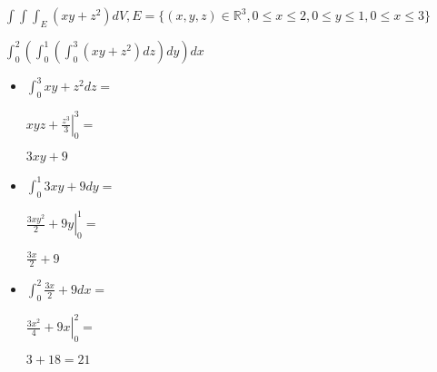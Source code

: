 \documentclass[../practica_08.tex]{subfiles}
\begin{document}
    $ \int \int \int_E (xy + z^2) dV, E = \{(x,y,z) \in \mathbb{R}^3, 0\leq x\leq 2, 0\leq y\leq 1, 0\leq x \leq 3\}$

    $ \int_0^2 (\int_0^1 (\int_0^3 (xy+z^2)dz) dy ) dx $

    \begin{itemize}
        \item $ \int_0^3 xy + z^2 dz = $
        
            $\left. xyz + \frac{z^3}{3}  \right |_0^3 = $

            $ 3xy + 9 $

        \item $\int_0^1 3xy + 9 dy = $
        
            $ \left. \frac{3xy^2}{2} + 9y \right |_0^1 = $

            $ \frac{3x}{2} + 9 $

        \item $\int_0^2 \frac{3x}{2} + 9 dx =$
    
            $ \left. \frac{3x^2}{4} + 9x \right |_0^2 =$

            $ 3 + 18 = 21 $

    \end{itemize}
\end{document}
